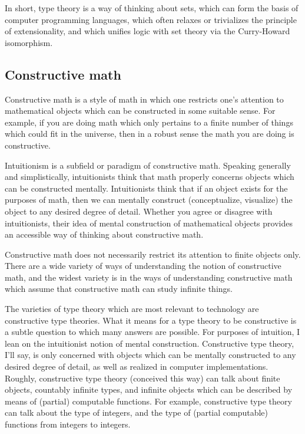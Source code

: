 \documentclass{article}
\begin{document}
In short, type theory is a way of thinking about sets, which can form the basis of computer programming languages, which often relaxes or trivializes the principle of extensionality, and which unifies logic with set theory via the Curry-Howard isomorphism.

\subsection{Constructive math}

Constructive math is a style of math in which one restricts one's attention to mathematical objects which can be constructed in some suitable sense. For example, if you are doing math which only pertains to a finite number of things which could fit in the universe, then in a robust sense the math you are doing is constructive.

Intuitionism is a subfield or paradigm of constructive math. Speaking generally and simplistically, intuitionists think that math properly concerns objects which can be constructed mentally. Intuitionists think that if an object exists for the purposes of math, then we can mentally construct (conceptualize, visualize) the object to any desired degree of detail. Whether you agree or disagree with intuitionists, their idea of mental construction of mathematical objects provides an accessible way of thinking about constructive math.

Constructive math does not necessarily restrict its attention to finite objects only. There are a wide variety of ways of understanding the notion of constructive math, and the widest variety is in the ways of understanding constructive math which assume that constructive math can study infinite things.

The varieties of type theory which are most relevant to technology are constructive type theories. What it means for a type theory to be constructive is a subtle question to which many answers are possible. For purposes of intuition, I lean on the intuitionist notion of mental construction. Constructive type theory, I'll say, is only concerned with objects which can be mentally constructed to any desired degree of detail, as well as realized in computer implementations. Roughly, constructive type theory (conceived this way) can talk about finite objects, countably infinite types, and infinite objects which can be described by means of (partial) computable functions. For example, constructive type theory can talk about the type of integers, and the type of (partial computable) functions from integers to integers.
\end{document}

